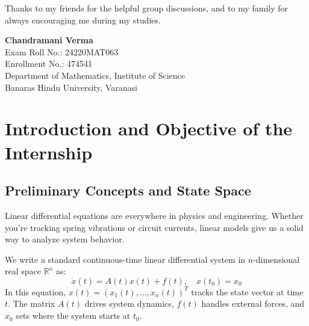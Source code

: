 \documentclass[12pt,a4paper,oneside]{article}
\theoremstyle{definition}
\theoremstyle{plain}
\begin{document}
\vspace{0.25cm}
Thanks to my friends for the helpful group discussions, and to my family for always encouraging me during my studies.

\vspace{1.5cm}
\begin{flushright}
    \textbf{Chandramani Verma}\\
    Exam Roll No.: 24220MAT063\\
    Enrollment No.: 474541\\
    Department of Mathematics, Institute of Science\\
    Banaras Hindu University, Varanasi
\end{flushright}

\newpage
\tableofcontents

\newpage
{}
\setcounter{page}{1}

\section{Introduction and Objective of the Internship}
\label{sec:introduction}

\subsection{Preliminary Concepts and State Space}

\vspace{0.1cm}
Linear differential equations are everywhere in physics and engineering. Whether you're tracking spring vibrations or circuit currents, linear models give us a solid way to analyze system behavior. 

\smallskip
We write a standard continuous-time linear differential system in $n$-dimensional real space $\mathbb{R}^n$ as:
\begin{equation}
    \dot{x}(t) = A(t) x(t) + f(t), \quad x(t_0) = x_0
    \label{eq:state_space_general_human_v8}
\end{equation}
In this equation, $x(t) = (x_1(t), \dots, x_n(t))^T$ tracks the state vector at time $t$. The matrix $A(t)$ drives system dynamics, $f(t)$ handles external forces, and $x_0$ sets where the system starts at $t_0$.
\end{document}
